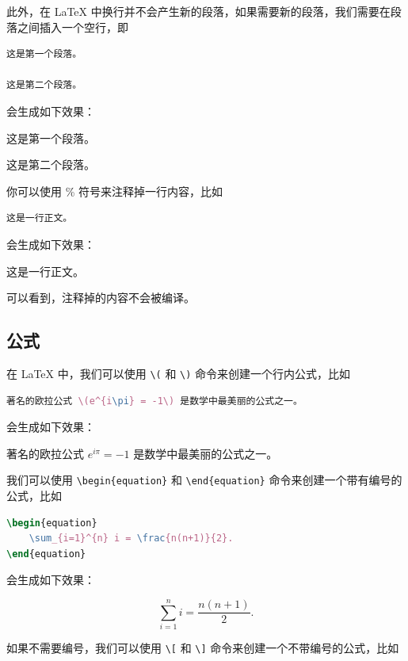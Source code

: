 此外，在 LaTeX 中换行并不会产生新的段落，如果需要新的段落，我们需要在段落之间插入一个空行，即

\begin{lstlisting}[language=TeX]
这是第一个段落。

这是第二个段落。
\end{lstlisting}

\noindent 会生成如下效果：

这是第一个段落。

这是第二个段落。

你可以使用 \% 符号来注释掉一行内容，比如

\begin{lstlisting}[language=TeX]
% 这是一行注释
这是一行正文。
\end{lstlisting}

\noindent 会生成如下效果：

这是一行正文。

可以看到，注释掉的内容不会被编译。

\subsection{公式}
在 LaTeX 中，我们可以使用 \texttt{\textbackslash (} 和 \texttt{\textbackslash )} 命令来创建一个行内公式，比如

\begin{lstlisting}[language=TeX]
著名的欧拉公式 \(e^{i\pi} = -1\) 是数学中最美丽的公式之一。
\end{lstlisting}

\noindent 会生成如下效果：

著名的欧拉公式 \(e^{i\pi} = -1\) 是数学中最美丽的公式之一。


我们可以使用 \texttt{\textbackslash begin\{equation\}} 和 \texttt{\textbackslash end\{equation\}} 命令来创建一个带有编号的公式，比如

\begin{lstlisting}[language=TeX]
\begin{equation}
    \sum_{i=1}^{n} i = \frac{n(n+1)}{2}.
\end{equation}
\end{lstlisting}

\noindent 会生成如下效果：

\begin{equation}
    \sum_{i=1}^{n} i = \frac{n(n+1)}{2}.
\end{equation}

如果不需要编号，我们可以使用 \texttt{\textbackslash [} 和 \texttt{\textbackslash ]} 命令来创建一个不带编号的公式，比如

